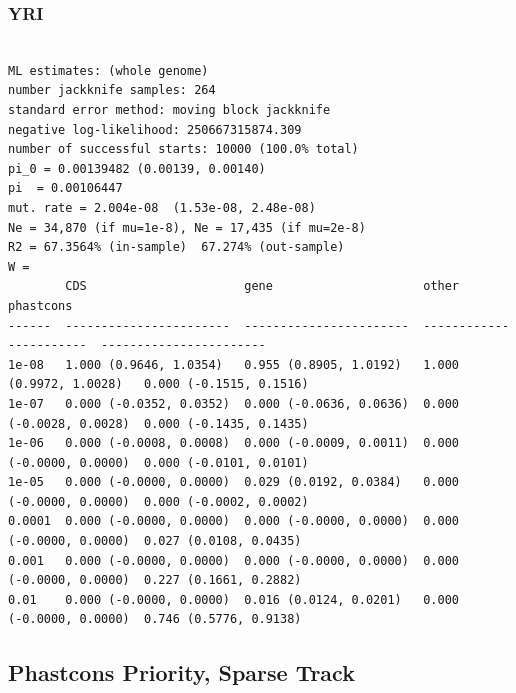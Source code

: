 \documentclass[11pt]{article}
\begin{document}
\subsubsection*{YRI}
\begin{minipage}{\linewidth}\begin{footnotesize}
\begin{verbatim}

ML estimates: (whole genome)
number jackknife samples: 264
standard error method: moving block jackknife
negative log-likelihood: 250667315874.309
number of successful starts: 10000 (100.0% total)
pi_0 = 0.00139482 (0.00139, 0.00140)
pi  = 0.00106447
mut. rate = 2.004e-08  (1.53e-08, 2.48e-08)
Ne = 34,870 (if mu=1e-8), Ne = 17,435 (if mu=2e-8)
R2 = 67.3564% (in-sample)  67.274% (out-sample)
W = 
        CDS                      gene                     other                    phastcons
------  -----------------------  -----------------------  -----------------------  -----------------------
1e-08   1.000 (0.9646, 1.0354)   0.955 (0.8905, 1.0192)   1.000 (0.9972, 1.0028)   0.000 (-0.1515, 0.1516)
1e-07   0.000 (-0.0352, 0.0352)  0.000 (-0.0636, 0.0636)  0.000 (-0.0028, 0.0028)  0.000 (-0.1435, 0.1435)
1e-06   0.000 (-0.0008, 0.0008)  0.000 (-0.0009, 0.0011)  0.000 (-0.0000, 0.0000)  0.000 (-0.0101, 0.0101)
1e-05   0.000 (-0.0000, 0.0000)  0.029 (0.0192, 0.0384)   0.000 (-0.0000, 0.0000)  0.000 (-0.0002, 0.0002)
0.0001  0.000 (-0.0000, 0.0000)  0.000 (-0.0000, 0.0000)  0.000 (-0.0000, 0.0000)  0.027 (0.0108, 0.0435)
0.001   0.000 (-0.0000, 0.0000)  0.000 (-0.0000, 0.0000)  0.000 (-0.0000, 0.0000)  0.227 (0.1661, 0.2882)
0.01    0.000 (-0.0000, 0.0000)  0.016 (0.0124, 0.0201)   0.000 (-0.0000, 0.0000)  0.746 (0.5776, 0.9138)
\end{verbatim}
\end{footnotesize}\end{minipage}


\subsection{Phastcons Priority, Sparse Track}
\end{document}
